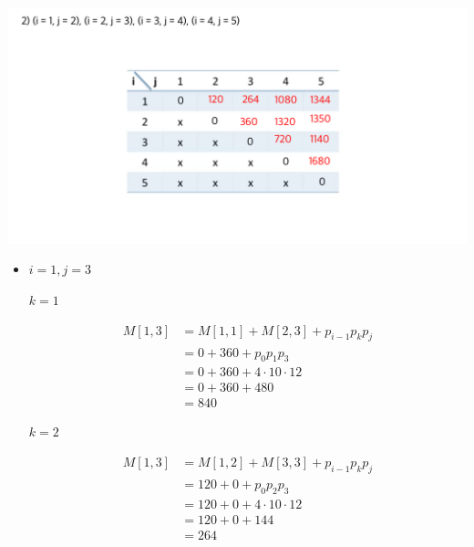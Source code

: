 \documentclass[12pt]{article}
\begin{document}
\begin{enumerate}[1.]
\begin{itemize}
\begin{itemize}
\begin{enumerate}[1.]
\begin{enumerate}[1)]
                    \begin{center}
                    \includegraphics[width=\linewidth]{images/worksheet_3_solution_4.png}
                    \end{center}

                    \begin{itemize}
                        \item $i = 1, j = 3$

                        \bigskip

                        \underline{$k = 1$}

                        \begin{align}
                            M[1,3] &= M[1,1] + M[2,3] + p_{i-1}p_kp_j\\
                            &= 0 + 360 + p_0p_1p_3\\
                            &= 0 + 360 + 4 \cdot 10 \cdot 12\\
                            &= 0 + 360 + 480\\
                            &= 840
                        \end{align}

                        \bigskip

                        \underline{$k = 2$}

                        \begin{align}
                            M[1,3] &= M[1,2] + M[3,3] + p_{i-1}p_kp_j\\
                            &= 120 + 0 + p_0p_2p_3\\
                            &= 120 + 0 + 4 \cdot 10 \cdot 12\\
                            &= 120 + 0 + 144\\
                            &= 264
                        \end{align}


\end{itemize}
\end{enumerate}
\end{enumerate}
\end{itemize}
\end{itemize}
\end{enumerate}
\end{document}
